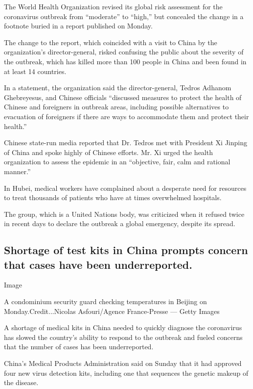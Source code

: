 The World Health Organization revised its global risk assessment for the
coronavirus outbreak from ``moderate'' to ``high,'' but concealed the
change in a footnote buried in a report published on Monday.

The change to the report, which coincided with a visit to China by the
organization's director-general, risked confusing the public about the
severity of the outbreak, which has killed more than 100 people in China
and been found in at least 14 countries.

In a statement, the organization said the director-general, Tedros
Adhanom Ghebreyesus, and Chinese officials ``discussed measures to
protect the health of Chinese and foreigners in outbreak areas,
including possible alternatives to evacuation of foreigners if there are
ways to accommodate them and protect their health.''

Chinese state-run media reported that Dr. Tedros met with President Xi
Jinping of China and spoke highly of Chinese efforts. Mr. Xi urged the
health organization to assess the epidemic in an ``objective, fair, calm
and rational manner.''

In Hubei, medical workers have complained about a desperate need for
resources to treat thousands of patients who have at times overwhelmed
hospitals.

The group, which is a United Nations body, was criticized when it
refused twice in recent days to declare the outbreak a global emergency,
despite its spread.

\hypertarget{shortage-of-test-kits-in-china-prompts-concern-that-cases-have-been-underreported}{%
\subsection{Shortage of test kits in China prompts concern that cases
have been
underreported.}\label{shortage-of-test-kits-in-china-prompts-concern-that-cases-have-been-underreported}}

Image

A condominium security guard checking temperatures in Beijing on
Monday.Credit...Nicolas Asfouri/Agence France-Presse --- Getty Images

A shortage of medical kits in China needed to quickly diagnose the
coronavirus has slowed the country's ability to respond to the outbreak
and fueled concerns that the number of cases has been underreported.

China's Medical Products Administration said on Sunday that it had
approved four new virus detection kits, including one that sequences the
genetic makeup of the disease.

